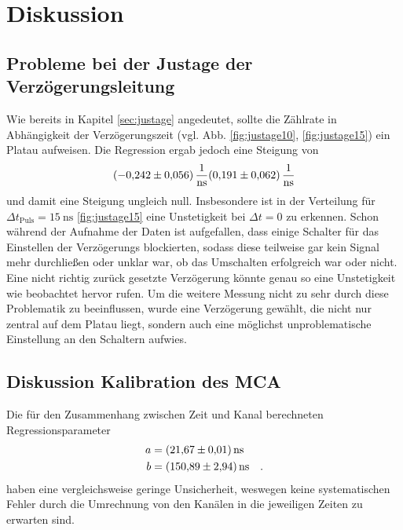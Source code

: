 \section{Diskussion}
\label{sec:Diskussion}

\subsection*{Probleme bei der Justage der Verzögerungsleitung}
Wie bereits in Kapitel \ref{sec:justage} angedeutet, sollte die Zählrate in Abhängigkeit der Verzögerungszeit (vgl. Abb. \ref{fig:justage10}, \ref*{fig:justage15})
ein Platau aufweisen. Die Regression ergab jedoch eine Steigung von 
\begin{align*}
    \SI{-0.242 \pm 0.056}{\per\nano\second}
    \SI{0.191 \pm 0.062 }{\per\nano\second}
\end{align*}
und damit eine Steigung ungleich null. Insbesondere ist in der Verteilung für $\Delta t_{\text{Puls}}=\SI{15}{\nano\second}$ \ref{fig:justage15} eine 
Unstetigkeit bei $\Delta t=0$ zu erkennen. Schon während der Aufnahme der Daten ist aufgefallen, dass einige Schalter für das Einstellen der Verzögerungs
blockierten, sodass diese teilweise gar kein Signal mehr durchließen oder unklar war, ob das Umschalten erfolgreich war oder nicht. Eine nicht richtig zurück
gesetzte Verzögerung könnte genau so eine Unstetigkeit wie beobachtet hervor rufen. Um die weitere Messung nicht zu sehr durch diese Problematik zu beeinflussen,
wurde eine Verzögerung gewählt, die nicht nur zentral auf dem Platau liegt, sondern auch eine möglichst unproblematische Einstellung an den Schaltern aufwies.

\subsection*{Diskussion Kalibration des MCA}
Die für den Zusammenhang zwischen Zeit und Kanal berechneten Regressionsparameter 
\begin{align*}
    a &= \SI{21.67 \pm 0.01}{\nano\second} \\ 
    b &= \SI{150.89 \pm 2.94}{\nano\second} \quad.
 \end{align*}
haben eine vergleichsweise geringe Unsicherheit, weswegen keine systematischen Fehler durch die Umrechnung von den Kanälen in die jeweiligen Zeiten zu erwarten sind. 

